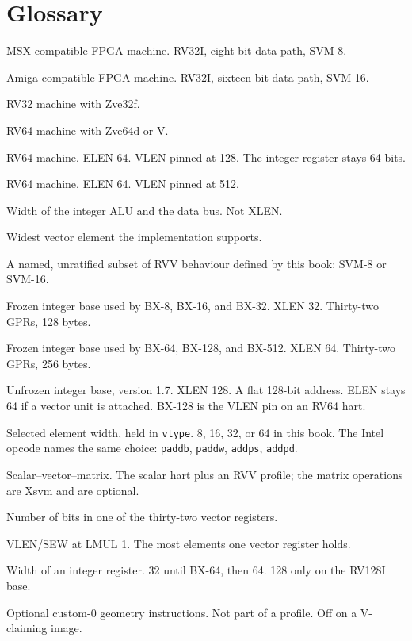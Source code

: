 \chapter{Glossary}

\begin{description}[leftmargin=1.5em,style=nextline]
  \item[BX-8] MSX-compatible FPGA machine. RV32I, eight-bit data path, SVM-8.
  \item[BX-16] Amiga-compatible FPGA machine. RV32I, sixteen-bit data path, SVM-16.
  \item[BX-32] RV32 machine with Zve32f.
  \item[BX-64] RV64 machine with Zve64d or V.
  \item[BX-128] RV64 machine. ELEN 64. VLEN pinned at 128. The integer register stays 64 bits.
  \item[BX-512] RV64 machine. ELEN 64. VLEN pinned at 512.
  \item[Datapath width] Width of the integer ALU and the data bus. Not XLEN.
  \item[ELEN] Widest vector element the implementation supports.
  \item[Profile] A named, unratified subset of RVV behaviour defined by this book: SVM-8 or SVM-16.
  \item[RV32] Frozen integer base used by BX-8, BX-16, and BX-32. XLEN 32. Thirty-two GPRs, 128 bytes.
  \item[RV64] Frozen integer base used by BX-64, BX-128, and BX-512. XLEN 64. Thirty-two GPRs, 256 bytes.
  \item[RV128I] Unfrozen integer base, version 1.7. XLEN 128. A flat 128-bit address. ELEN stays 64 if a vector unit is attached. BX-128 is the VLEN pin on an RV64 hart.
  \item[SEW] Selected element width, held in \texttt{vtype}. 8, 16, 32, or 64 in this book. The Intel opcode names the same choice: \texttt{paddb}, \texttt{paddw}, \texttt{addps}, \texttt{addpd}.
  \item[SVM] Scalar--vector--matrix. The scalar hart plus an RVV profile; the matrix operations are Xsvm and are optional.
  \item[VLEN] Number of bits in one of the thirty-two vector registers.
  \item[VLMAX] VLEN/SEW at LMUL 1. The most elements one vector register holds.
  \item[XLEN] Width of an integer register. 32 until BX-64, then 64. 128 only on the RV128I base.
  \item[Xsvm] Optional custom-0 geometry instructions. Not part of a profile. Off on a V-claiming image.

\end{description}
